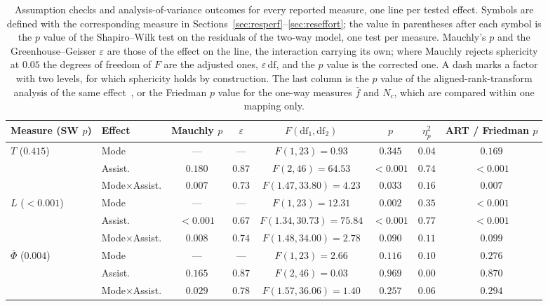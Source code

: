 \documentclass[12pt,a4paper,twoside,openright]{report}
\begin{document}
\begin{table}[p]
\centering
\footnotesize
\caption[Assumption checks and analysis-of-variance outcomes for every reported measure]{Assumption checks and analysis-of-variance outcomes for every reported measure, one line per tested effect. Symbols are defined with the corresponding measure in Sections~\ref{sec:resperf}--\ref{sec:reseffort}; the value in parentheses after each symbol is the $p$ value of the Shapiro--Wilk test on the residuals of the two-way model, one test per measure. Mauchly's $p$ and the Greenhouse--Geisser $\varepsilon$ are those of the effect on the line, the interaction carrying its own; where Mauchly rejects sphericity at $0.05$ the degrees of freedom of $F$ are the adjusted ones, $\varepsilon\,\mathrm{df}$, and the $p$ value is the corrected one. A dash marks a factor with two levels, for which sphericity holds by construction. The last column is the $p$ value of the aligned-rank-transform analysis of the same effect~\cite{wobbrock2011art}, or the Friedman $p$ value for the one-way measures $\bar f$ and $N_c$, which are compared within one mapping only.}
\label{tab:assumptions}
\setlength{\tabcolsep}{3.5pt}\scriptsize
\begin{tabular}{@{}llcccccc@{}}
\toprule
Measure (SW $p$) & Effect & Mauchly $p$ & $\varepsilon$ & $F(\mathrm{df}_1,\mathrm{df}_2)$ & $p$ & $\eta^2_p$ & ART / Friedman $p$ \\
\midrule
$T$ ($0.415$) & Mode & --- & --- & $F(1,23)=0.93$ & $0.345$ & $0.04$ & $0.169$ \\
 & Assist. & $0.180$ & $0.87$ & $F(2,46)=64.53$ & $<0.001$ & $0.74$ & $<0.001$ \\
 & Mode$\times$Assist. & $0.007$ & $0.73$ & $F(1.47,33.80)=4.23$ & $0.033$ & $0.16$ & $0.007$ \\
\addlinespace[2pt]
$L$ ($<0.001$) & Mode & --- & --- & $F(1,23)=12.31$ & $0.002$ & $0.35$ & $<0.001$ \\
 & Assist. & $<0.001$ & $0.67$ & $F(1.34,30.73)=75.84$ & $<0.001$ & $0.77$ & $<0.001$ \\
 & Mode$\times$Assist. & $0.008$ & $0.74$ & $F(1.48,34.00)=2.78$ & $0.090$ & $0.11$ & $0.099$ \\
\addlinespace[2pt]
$\bar{\Phi}$ ($0.004$) & Mode & --- & --- & $F(1,23)=2.66$ & $0.116$ & $0.10$ & $0.276$ \\
 & Assist. & $0.165$ & $0.87$ & $F(2,46)=0.03$ & $0.969$ & $0.00$ & $0.870$ \\
 & Mode$\times$Assist. & $0.029$ & $0.78$ & $F(1.57,36.06)=1.40$ & $0.257$ & $0.06$ & $0.294$ \\

\end{tabular}
\end{table}
\end{document}
